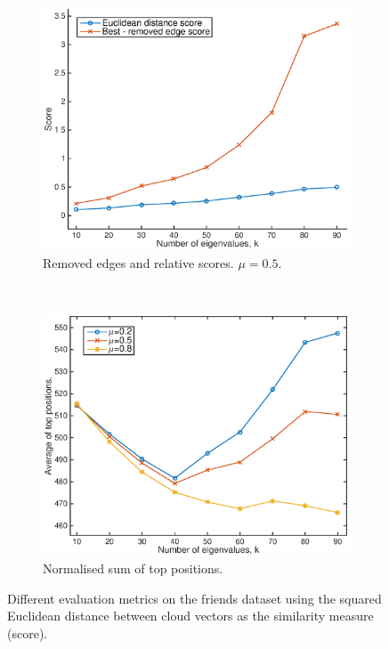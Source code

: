 \documentclass[12pt]{report}
\begin{document}
\begin{figure}[tpb]
\begin{subfigure}[b]{0.5\textwidth}
    \label{fig:fb_eig_better}
  \end{subfigure}
  \begin{subfigure}[b]{0.5\textwidth}
    \includegraphics[width=\textwidth]{fb_eig_scores}
		\caption{Removed edges and relative scores. $\mu = 0.5$.}
    \label{fig:fb_eig_scores}
  \end{subfigure}%
  ~
  \begin{subfigure}[b]{0.5\textwidth}
    \includegraphics[width=\textwidth]{fb_eig_pos}
    \caption{Normalised sum of top positions.}
    \label{fig:fb_eig_pos}
  \end{subfigure}
  \caption{Different evaluation metrics on the friends dataset using the
  squared Euclidean distance between cloud vectors as the similarity measure
  (score).}
  \label{fig:fb_eval_euclidean}
\end{figure}
\end{document}

